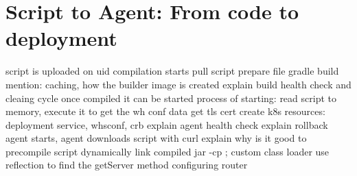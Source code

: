 \section[Script to Agent]{Script to Agent: From code to deployment}

script is uploaded on uid
compilation starts
    pull script
    prepare file
    gradle build
    mention: caching, how the builder image is created
    explain build health check and cleaing cycle
once compiled it can be started
process of starting:    
    read script to memory, execute it to get the wh conf data
    get tls cert
    create k8s resources: deployment service, whsconf, crb
    explain agent health check
    explain rollback
agent starts, agent downloads script with curl
    explain why is it good to precompile script
    dynamically link compiled jar -cp ; custom class loader
    use reflection to find the getServer method
    configuring router